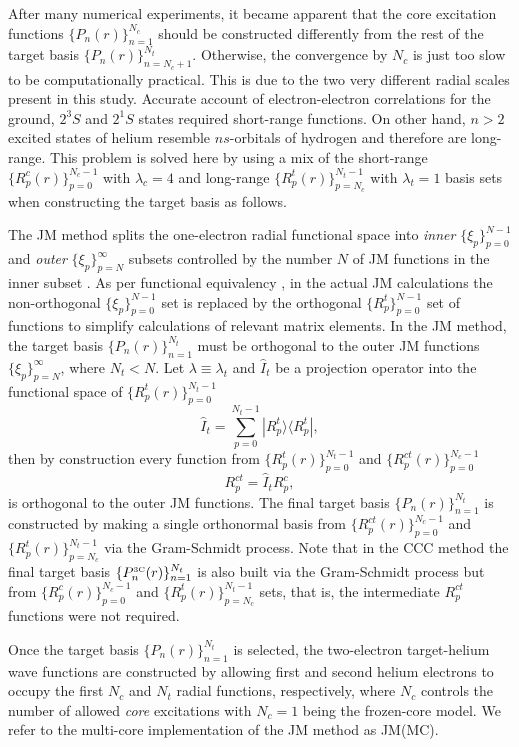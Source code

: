 \documentclass[aip
, pra
, showpacs
, aps
, twocolumn
, groupedaddress
, floatfix
]{revtex4}
\newcommand{\beq}{\begin{equation}}
\newcommand{\eeq}{\end{equation}}
\begin{document}
After many numerical experiments, it became apparent that the core excitation functions $\{P_n(r)\}_{n=1}^{N_c}$ should be constructed differently from the rest of the target basis
$\{P_n(r)\}_{n=N_c+1}^{N_t}$. Otherwise, the convergence by $N_c$ is just too slow to be computationally practical.
This is due to the two very different radial scales present in this study.
Accurate account of electron-electron correlations for the ground, $2^3S$ and $2^1S$ states required short-range functions. 
On other hand,  $n>2$ excited states of helium
resemble $ns$-orbitals of hydrogen and therefore are long-range.
This problem is solved here by using a mix of the short-range $\{R^c_p(r)\}_{p=0}^{N_c-1}$ with $\lambda_c=4$
and long-range $\{R^t_p(r)\}_{p=N_c}^{N_t-1}$ with $\lambda_t=1$  basis sets
when constructing the target basis as follows.


The JM method splits the one-electron radial functional space into {\em inner} $\{\xi_p\}_{p=0}^{N-1}$
and {\em outer} $\{\xi_p\}_{p=N}^\infty$
subsets controlled by the number $N$ of JM functions in the inner subset \cite{HY74p1201,BR76p1491}.
As per functional equivalency \cite{KB10p022708}, in the actual JM calculations the non-orthogonal $\{\xi_p\}_{p=0}^{N-1}$ set is replaced by
the orthogonal $\{R^t_p\}_{p=0}^{N-1}$ set of functions to simplify calculations of relevant matrix elements.
In the JM method, the target basis $\{P_n(r)\}_{n=1}^{N_t}$ must be orthogonal to the outer JM functions $\{\xi_p\}_{p=N}^\infty$, where $N_t<N$.
Let $\lambda \equiv \lambda_t$ and $\hat{I}_t$ be a projection operator into the functional space of $\{R^t_p(r)\}_{p=0}^{N_t-1}$
\beq
\hat{I}_t = \sum_{p=0}^{N_t-1} | R_p^t \rangle \langle R_p^t |,
\label{I_t}
\eeq
then by construction every function from $\{R^t_p(r)\}_{p=0}^{N_t-1}$ and  $\{R^{ct}_p(r)\}_{p=0}^{N_c-1}$
\beq
R^{ct}_p = \hat{I}_t R^{c}_p,
\eeq
is orthogonal to the outer JM functions.
The final target basis $\{P_n(r)\}_{n=1}^{N_t}$ is constructed by making a single orthonormal basis from
$\{R^{ct}_p(r)\}_{p=0}^{N_c-1}$ and $\{R^t_p(r)\}_{p=N_c}^{N_t-1}$
via the Gram-Schmidt process.
Note that in the CCC method the final target basis
$\{P^{\mbox{{\tiny 3C}}}_n(r)\}_{n=1}^{N_t}$ is also built via the Gram-Schmidt process but from
$\{R^{c}_p(r)\}_{p=0}^{N_c-1}$ and $\{R^t_p(r)\}_{p=N_c}^{N_t-1}$ sets, that is, the intermediate $R^{ct}_p$ functions were not required.



Once the target basis $\{P_n(r)\}_{n=1}^{N_t}$ is selected,
the two-electron target-helium wave functions are constructed by allowing first and second helium electrons to occupy the first $N_c$ and $N_t$ radial functions, respectively,
where $N_c$ controls the number of allowed {\em core} excitations with $N_c=1$ being the frozen-core model.
We refer to the multi-core implementation of the JM method as JM(MC).
\end{document}
